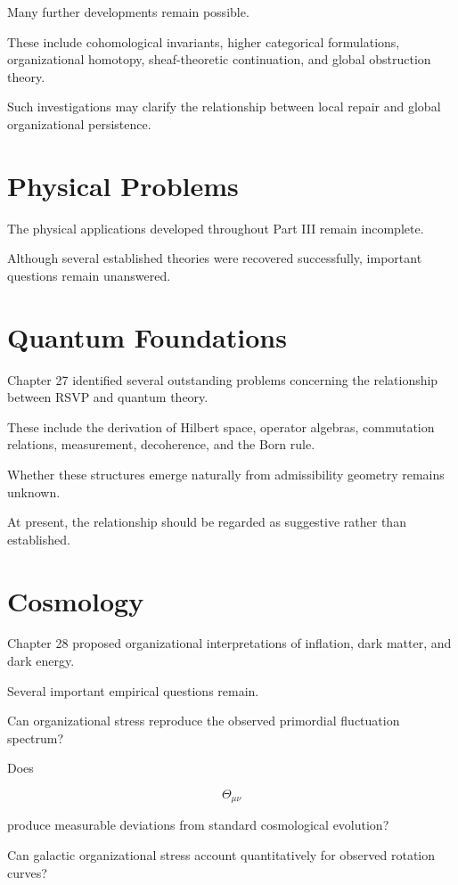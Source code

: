 \documentclass[11pt,oneside]{book}
\numberwithin{equation}{chapter}
\theoremstyle{definition}
\theoremstyle{plain}
\begin{document}
Many further developments remain possible.

These include cohomological invariants, higher categorical formulations,
organizational homotopy, sheaf-theoretic continuation, and global
obstruction theory.

Such investigations may clarify the relationship between local repair and
global organizational persistence.

\section{Physical Problems}

The physical applications developed throughout Part III remain incomplete.

Although several established theories were recovered successfully,
important questions remain unanswered.

\section{Quantum Foundations}

Chapter 27 identified several outstanding problems concerning the
relationship between RSVP and quantum theory.

These include the derivation of Hilbert space, operator algebras,
commutation relations, measurement, decoherence, and the Born rule.

Whether these structures emerge naturally from admissibility geometry
remains unknown.

At present, the relationship should be regarded as suggestive rather than
established.

\section{Cosmology}

Chapter 28 proposed organizational interpretations of inflation, dark
matter, and dark energy.

Several important empirical questions remain.

Can organizational stress reproduce the observed primordial fluctuation
spectrum?

Does

\[
\Theta_{\mu\nu}
\]

produce measurable deviations from standard cosmological evolution?

Can galactic organizational stress account quantitatively for observed
rotation curves?
\end{document}
